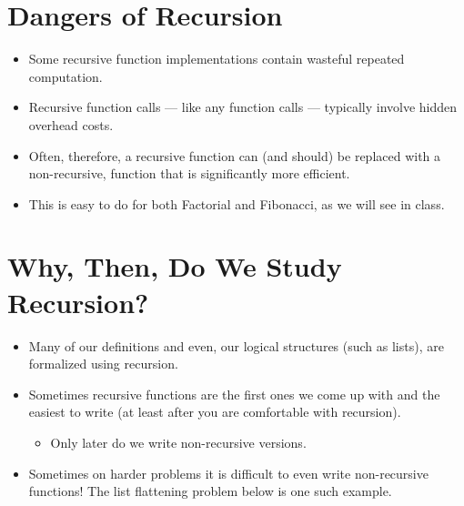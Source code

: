 \documentclass[letterpaper,10pt,english]{sphinxmanual}
\begin{document}
\section{Dangers of Recursion}
\label{\detokenize{lecture_notes/lec23_recursion:dangers-of-recursion}}\begin{itemize}
\item {} 
Some recursive function implementations contain wasteful repeated
computation.

\item {} 
Recursive function calls — like any function calls — typically
involve hidden overhead costs.

\item {} 
Often, therefore, a recursive function can (and should) be replaced
with a non-recursive,  function that is significantly more
efficient.

\item {} 
This is easy to do for both Factorial and Fibonacci, as we will see
in class.

\end{itemize}


\section{Why, Then, Do We Study Recursion?}
\label{\detokenize{lecture_notes/lec23_recursion:why-then-do-we-study-recursion}}\begin{itemize}
\item {} 
Many of our definitions and even, our logical structures (such as
lists), are formalized using recursion.

\item {} 
Sometimes recursive functions are the first ones we come up with and
the easiest to write (at least after you are comfortable with
recursion).
\begin{itemize}
\item {} 
Only later do we write non-recursive versions.

\end{itemize}

\item {} 
Sometimes on harder problems it is difficult to even write non-recursive
functions!  The list flattening problem below is one such example.

\end{itemize}
\end{document}
